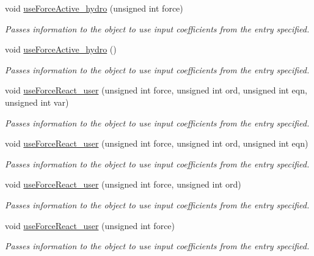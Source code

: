 \begin{DoxyCompactItemize}
void \hyperlink{classosea_1_1ofreq_1_1_motion_model_a59ac49cac82e8214a2e1420e2f02736b}{use\-Force\-Active\-\_\-hydro} (unsigned int force)
\begin{DoxyCompactList}\small\item\em Passes information to the object to use input coefficients from the entry specified. \end{DoxyCompactList}\item 
void \hyperlink{classosea_1_1ofreq_1_1_motion_model_afe1c219c16bd1b3eb63f49065872cec6}{use\-Force\-Active\-\_\-hydro} ()
\begin{DoxyCompactList}\small\item\em Passes information to the object to use input coefficients from the entry specified. \end{DoxyCompactList}\item 
void \hyperlink{classosea_1_1ofreq_1_1_motion_model_a7db1d1ebebe216d17efd7b38f2e9deec}{use\-Force\-React\-\_\-user} (unsigned int force, unsigned int ord, unsigned int eqn, unsigned int var)
\begin{DoxyCompactList}\small\item\em Passes information to the object to use input coefficients from the entry specified. \end{DoxyCompactList}\item 
void \hyperlink{classosea_1_1ofreq_1_1_motion_model_a26352f59cd049a551ff692c5feb0b387}{use\-Force\-React\-\_\-user} (unsigned int force, unsigned int ord, unsigned int eqn)
\begin{DoxyCompactList}\small\item\em Passes information to the object to use input coefficients from the entry specified. \end{DoxyCompactList}\item 
void \hyperlink{classosea_1_1ofreq_1_1_motion_model_afa99c39f1018471c2ce0793f5de6987b}{use\-Force\-React\-\_\-user} (unsigned int force, unsigned int ord)
\begin{DoxyCompactList}\small\item\em Passes information to the object to use input coefficients from the entry specified. \end{DoxyCompactList}\item 
void \hyperlink{classosea_1_1ofreq_1_1_motion_model_a805e8c1ff2fdb767543011b093ec8e86}{use\-Force\-React\-\_\-user} (unsigned int force)
\begin{DoxyCompactList}\small\item\em Passes information to the object to use input coefficients from the entry specified. \end{DoxyCompactList}\item 

\end{DoxyCompactItemize}
